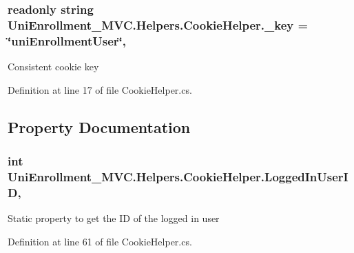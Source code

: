 \subsubsection[{\texorpdfstring{\+\_\+key}{_key}}]{\setlength{\rightskip}{0pt plus 5cm}readonly string Uni\+Enrollment\+\_\+\+M\+V\+C.\+Helpers.\+Cookie\+Helper.\+\_\+key = \char`\"{}uni\+Enrollment\+User\char`\"{}\hspace{0.3cm}{\ttfamily [static]}, {\ttfamily [private]}}\hypertarget{class_uni_enrollment___m_v_c_1_1_helpers_1_1_cookie_helper_a94ac4283c0121050ef36d4080b526292}{}\label{class_uni_enrollment___m_v_c_1_1_helpers_1_1_cookie_helper_a94ac4283c0121050ef36d4080b526292}


Consistent cookie key 



Definition at line 17 of file Cookie\+Helper.\+cs.



\subsection{Property Documentation}
\subsubsection[{\texorpdfstring{Logged\+In\+User\+ID}{LoggedInUserID}}]{\setlength{\rightskip}{0pt plus 5cm}int Uni\+Enrollment\+\_\+\+M\+V\+C.\+Helpers.\+Cookie\+Helper.\+Logged\+In\+User\+ID\hspace{0.3cm}{\ttfamily [static]}, {\ttfamily [get]}}\hypertarget{class_uni_enrollment___m_v_c_1_1_helpers_1_1_cookie_helper_ad8cb6ddc9015967aabd9c74f2000ea0c}{}\label{class_uni_enrollment___m_v_c_1_1_helpers_1_1_cookie_helper_ad8cb6ddc9015967aabd9c74f2000ea0c}


Static property to get the ID of the logged in user 



Definition at line 61 of file Cookie\+Helper.\+cs.


